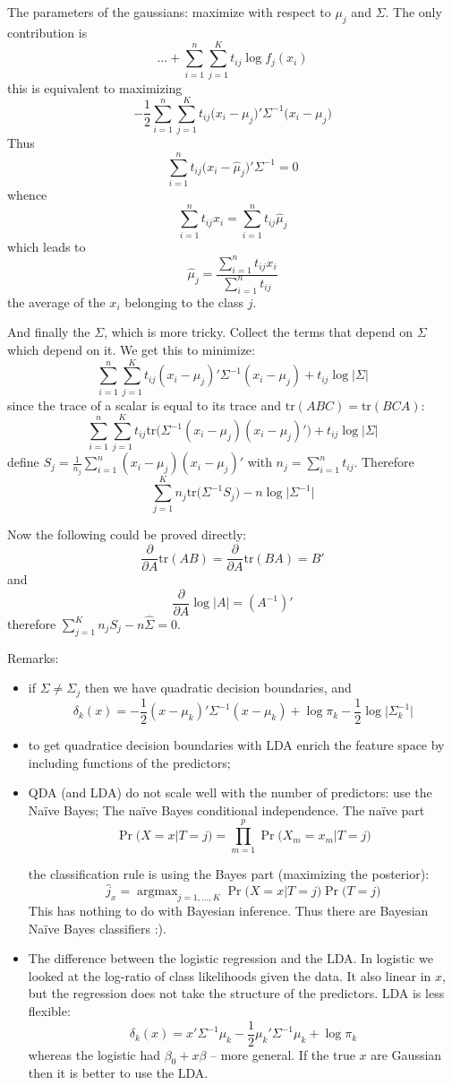 \documentclass[a4paper]{article}
\newcommand{\argmax}{\mathop{\text{argmax}}}
\newcommand{\tr}{\text{tr}}
\begin{document}
The parameters of the gaussians: maximize with respect to $\mu_j$ and $\Sigma$. The only contribution is
\[\ldots + \sum_{i=1}^n \sum_{j=1}^K t_{ij} \log f_j(x_i) \]
this is equivalent to maximizing
\[ -\frac{1}{2} \sum_{i=1}^n \sum_{j=1}^K t_{ij} \big(x_i-\mu_j\big)'\Sigma^{-1}\big(x_i-\mu_j\big)\] 
Thus
\[\sum_{i=1}^n t_{ij} \big(x_i-\hat{\mu}_j\big)'\Sigma^{-1} = 0\]
whence
\[\sum_{i=1}^n t_{ij} x_i = \sum_{i=1}^n t_{ij} \hat{\mu}_j\]
which leads to
\[\hat{\mu}_j = \frac{\sum_{i=1}^n t_{ij} x_i }{\sum_{i=1}^n t_{ij}}\]
the average of the $x_i$ belonging to the class $j$.

And finally the $\Sigma$, which is more tricky.
Collect the terms that depend on $\Sigma$ which depend on it. We get this to minimize:
\[ \sum_{i=1}^n \sum_{j=1}^K t_{ij} (x_i-\mu_j)'\Sigma^{-1}(x_i-\mu_j) + t_{ij} \log \lvert\Sigma\rvert \]
since the trace of a scalar is equal to its trace and $\tr(ABC) = \tr(BCA)$:
\[\sum_{i=1}^n \sum_{j=1}^K t_{ij} \tr\big( \Sigma^{-1}(x_i-\mu_j)(x_i-\mu_j)'\big) + t_{ij} \log \lvert\Sigma\rvert\] 
define $S_j = \frac{1}{n_j}\sum_{i=1}^n(x_i-\mu_j)(x_i-\mu_j)'$ with $n_j=\sum_{i=1}^n t_{ij}$. Therefore
\[\sum_{j=1}^K n_j \tr\big( \Sigma^{-1} S_j \big) - n \log \lvert\Sigma^{-1}\rvert\] 

Now the following could be proved directly:
\[\frac{\partial}{\partial A}\tr(AB) = \frac{\partial}{\partial A}\tr(BA) = B'\]
and
\[\frac{\partial}{\partial A}\log \lvert A\rvert = (A^{-1})'\]
therefore $\sum_{j=1}^K n_j S_j - n \hat{\Sigma} = 0$.

Remarks: \begin{itemize}
	\item if $\Sigma\neq\Sigma_j$ then we have quadratic decision boundaries, and 
	\[\delta_k(x) = - \frac{1}{2} (x-\mu_k)'\Sigma^{-1}(x-\mu_k) + \log \pi_k - \frac{1}{2}\log\lvert\Sigma_k^{-1}\rvert\]
	\item to get quadratice decision boundaries with LDA enrich the feature space by including functions of the predictors;
	\item QDA (and LDA) do not scale well with the number of predictors: use the Na\"ive Bayes;
	The na\"ive Bayes conditional independence. The na\"ive part
	\[\Pr\big(X=x\vert T=j\big) = \prod_{m=1}^p \Pr\big(X_m=x_m\vert T=j\big)\]

	the classification rule is using the Bayes part (maximizing the posterior):
	\[\hat{j}_x = \argmax_{j=1,\ldots, K} \Pr\big(X=x\vert T=j\big) \Pr\big(T=j\big)\]
	This has nothing to do with Bayesian inference. Thus there are Bayesian Na\"ive Bayes classifiers :).
	\item The difference between the logistic regression and the LDA. In logistic we looked at
	the log-ratio of class likelihoods given the data. It also linear in $x$, but the regression
	does not take the structure of the predictors.
	LDA is less flexible:
	\[\delta_k(x) = x'\Sigma^{-1}\mu_k - \frac{1}{2} \mu_k'\Sigma^{-1}\mu_k + \log \pi_k\]
	whereas the logistic had $\beta_0 + x\beta$ -- more general.
	If the true $x$ are Gaussian then it is better to use the LDA.
\end{itemize}
\end{document}
